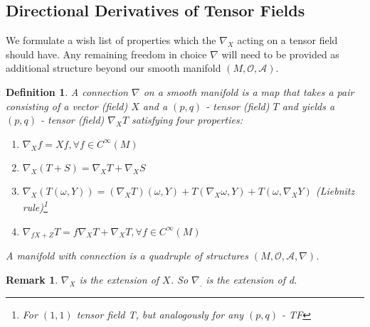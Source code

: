 \documentclass[10pt, oneside]{article}
\newtheorem{defn}{Definition}
\newtheorem{remark}{Remark}
\begin{document}
 \subsection{Directional Derivatives of Tensor Fields}
  We formulate a wish list of properties which the $\nabla_X$ acting on a tensor field should have. Any remaining freedom in choice $\nabla$ will need to be provided as additional structure beyond our smooth manifold $(M, \mathcal{O}, \mathcal{A})$.
 \begin{defn}
  A connection $\nabla$ on a smooth manifold is a map that takes a pair consisting of a vector (field) $X$ and a $(p,q)$ - tensor (field) $T$ and yields a $(p,q)$ - tensor (field) $\nabla_X T$ satisfying four properties:
  \begin{enumerate}
     \item $\nabla_X f = X f, \forall f \in C^\infty (M)$
     \item $\nabla_X (T + S) = \nabla_X T + \nabla_X S$
     \item $\nabla_X(T(\omega,Y))= (\nabla_X T)(\omega, Y)+T(\nabla_X \omega,Y)+T(\omega,\nabla_X Y)$ (Liebnitz rule)\footnote{For $(1,1)$ tensor field T, but analogously for any $(p,q)$ - TF}
     \item $\nabla_{f X +Z} T = f \nabla_X T +\nabla_X T, \forall f \in C^\infty (M)$
  \end{enumerate}
  A manifold with connection is a quadruple of structures $(M, \mathcal{O},\mathcal{A}, \nabla)$.
  \end{defn}
  \begin{remark}
     $\nabla_X$ is the extension of $X$. So $\nabla_.$ is the extension of d.
  \end{remark}
\end{document}
